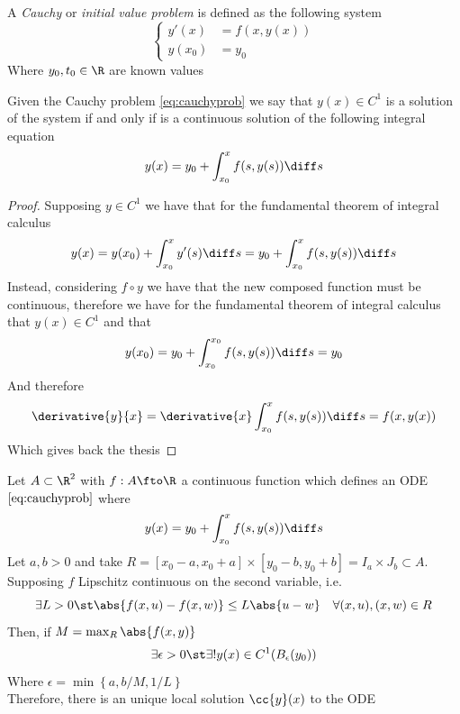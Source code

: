 \documentclass[../mmf.tex]{subfiles}
\begin{document}
\begin{dfn}
	A \textit{Cauchy} or \textit{initial value problem} is defined as the following system
	\begin{equation}
		\left\{ \begin{aligned}
				y'(x)&=f(x,y(x))\\
				y(x_0)&=y_0
		\end{aligned}\right.
		\label{eq:cauchyprob}
	\end{equation}
	Where $y_0,t_0\in\R$ are known values
\end{dfn}
\begin{thm}
	Given the Cauchy problem \eqref{eq:cauchyprob} we say that $y(x)\in C^1$ is a solution of the system if and only if is a continuous solution of the following integral equation
	\begin{equation}
		y(x)=y_0+\int_{x_0}^{x}f(s,y(s))\diff s
		\label{eq:cauchyprobsol}
	\end{equation}
\end{thm}
\begin{proof}
	Supposing $y\in C^1$ we have that for the fundamental theorem of integral calculus
	\begin{equation*}
		y(x)=y(x_0)+\int_{x_0}^{x}y'(s)\diff s=y_0+\int_{x_0}^{x}f(s,y(s))\diff s
	\end{equation*}
	Instead, considering $f\circ y$ we have that the new composed function must be continuous, therefore we have for the fundamental theorem of integral calculus that $y(x)\in C^1$ and that
	\begin{equation*}
		y(x_0)=y_0+\int_{x_0}^{x_0}f(s,y(s))\diff s=y_0
	\end{equation*}
	And therefore
	\begin{equation*}
		\derivative{y}{x}=\derivative{x}\int_{x_0}^{x}f(s,y(s))\diff s=f(x,y(x))
	\end{equation*}
	Which gives back the thesis
\end{proof}
\begin{thm}
	Let $A\subset\R^2$ with $f:A\fto\R$ a continuous function which defines an ODE $\eqref{eq:cauchyprob}$ where
	\begin{equation*}
		y(x)=y_0+\int_{x_0}^{x}f(s,y(s))\diff s
	\end{equation*}
	Let $a,b>0$ and take $R=[x_0-a,x_0+a]\times[y_0-b,y_0+b]=I_a\times J_b\subset A$. Supposing $f$ Lipschitz continuous on the second variable, i.e.
	\begin{equation*}
		\exists L>0\st\abs{f(x,u)-f(x,w)}\le L\abs{u-w}\quad \forall (x,u),(x,w)\in R
	\end{equation*}
	Then, if $M=\max_R\abs{f(x,y)}$
	\begin{equation*}
		\exists\epsilon>0\st\exists!y(x)\in C^1(B_\epsilon(y_0))
	\end{equation*}
	Where $\epsilon=\min\left\{ a,b/M,1/L \right\}$\\
	Therefore, there is an unique local solution $\cc{y}(x)$ to the ODE
\end{thm}
\end{document}
